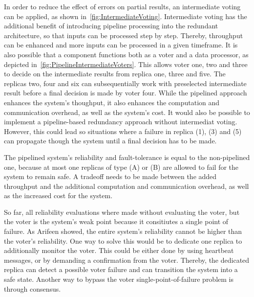 In order to reduce the effect of errors on partial results, an intermediate voting can be applied, as shown in~\autoref{fig:IntermediateVoting}.
Intermediate voting has the additional benefit of introducing pipeline processing into the redundant architecture, so that inputs can be processed step by step.
Thereby, throughput can be enhanced and more inputs can be processed in a given timeframe.
It is also possible that a component functions both as a voter and a data processor, as depicted in~\autoref{fig:PipelineIntermediateVoters}.
This allows voter one, two and three to decide on the intermediate results from replica one, three and five.
The replicas two, four and six can subsequentially work with preselected intermediate result before a final decision is made by voter four.
While the pipelined approach enhances the system's thoughput, it also enhances the computation and communication overhead, as well as the system's cost.
It would also be possible to implement a pipeline-based redundancy approach without intermediat voting.
However, this could lead so situations where a failure in replica (1), (3) and (5) can propagate though the system until a final decision has to be made.

The pipelined system's reliability and fault-tolerance is equal to the non-pipelined one, because at most one replicas of type (A) or (B) are allowed to fail for the system to remain safe.
A tradeoff needs to be made between the added throughput and the additional computation and communication overhead, as well as the increased cost for the system.

So far, all reliability evaluations where made without evaluating the voter, but the voter is the system's weak point because it consitiutes a single point of failure.
As Arifeen \etal showed, the entire system's reliability cannot be higher than the voter's reliability.
One way to solve this would be to dedicate one replica to additionally monitor the voter.
This could be either done by using heartbeat messages, or by demanding a confirmation from the voter.
Thereby, the dedicated replica can detect a possible voter failure and can transition the system into a safe state.
Another way to bypass the voter single-point-of-failure problem is through consensus.

